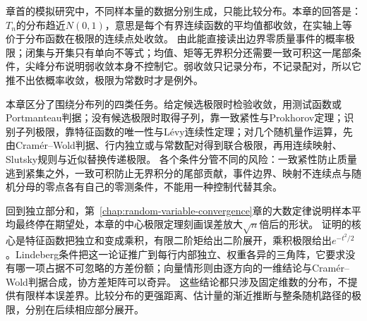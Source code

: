 章首的模拟研究中，不同样本量的数据分别生成，只能比较分布。本章的回答是：$T_n$的分布趋近$N(0,1)$，意思是每个有界连续函数的平均值都收敛，在实轴上等价于分布函数在极限的连续点处收敛。
由此能直接读出边界零质量事件的概率极限；闭集与开集只有单向不等式；均值、矩等无界积分还需要一致可积这一尾部条件，尖峰分布说明弱收敛本身不控制它。弱收敛只记录分布，不记录配对，所以它推不出依概率收敛，极限为常数时才是例外。

本章区分了围绕分布列的四类任务。给定候选极限时检验收敛，用测试函数或Portmanteau判据；没有候选极限时取得子列，靠一致紧性与Prokhorov定理；识别子列极限，靠特征函数的唯一性与L\'evy连续性定理；对几个随机量作运算，先由Cram\'er--Wold判据、行内独立或与常数配对得到联合极限，再用连续映射、Slutsky规则与近似替换传递极限。
各个条件分管不同的风险：一致紧性防止质量逃到紧集之外，一致可积防止无界积分的尾部贡献，事件边界、映射不连续点与随机分母的零点各有自己的零测条件，不能用一种控制代替其余。

回到独立部分和，第~\ref{chap:random-variable-convergence}章的大数定律说明样本平均最终停在期望处，本章的中心极限定理刻画误差放大$\sqrt n$倍后的形状。
证明的核心是特征函数把独立和变成乘积，有限二阶矩给出二阶展开，乘积极限给出$e^{-t^2/2}$。Lindeberg条件把这一论证推广到每行内部独立、权重各异的三角阵，它要求没有哪一项占据不可忽略的方差份额；向量情形则由逐方向的一维结论与Cram\'er--Wold判据合成，协方差矩阵可以奇异。
这些结论都只涉及固定维数的分布，不提供有限样本误差界。比较分布的更强距离、估计量的渐近推断与整条随机路径的极限，分别在后续相应部分展开。

